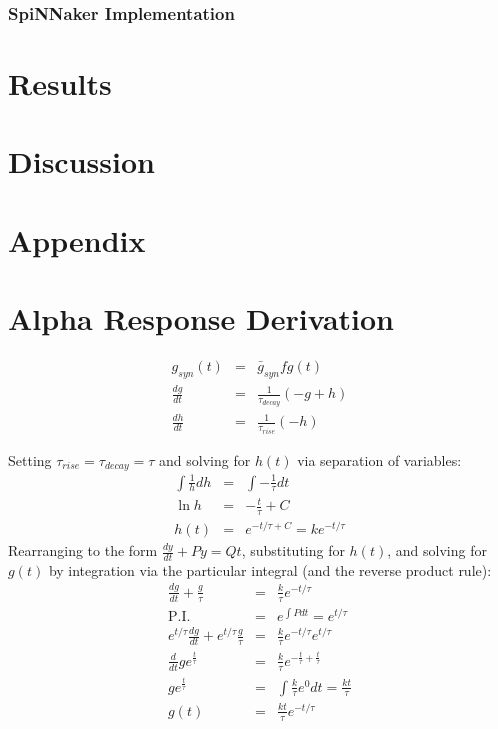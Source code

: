 \documentclass[12pt]{article}
\begin{document}
 \subsubsection*{SpiNNaker Implementation}

\section{Results}

\section{Discussion}
\section{Appendix}
\appendix
\section{Alpha Response Derivation}
\begin{eqnarray}
g_{syn}(t) & = & \bar{g}_{syn}fg(t) \nonumber \\
\frac{dg}{dt} & = & \frac{1}{\tau_{decay}} (-g + h) \nonumber \\
\frac{dh}{dt} & = & \frac{1}{\tau_{rise}}(-h) \nonumber
\end{eqnarray}

Setting $\tau_{rise}=\tau_{decay} = \tau$ and solving for $h(t)$ via separation
of variables:
\begin{eqnarray}
\int \frac{1}{h} dh & = & \int -\frac{1}{\tau}dt \nonumber \\
\ln{h}&=&-\frac{t}{\tau} + C \nonumber \\
h(t) & = & e^{-{t/\tau}+C} = ke^{-t / \tau} \nonumber
\end{eqnarray}
Rearranging to the form $\frac{dy}{dt} +Py = Qt$, substituting  for $h(t)$, and
solving for $g(t)$ by integration via the particular integral (and the reverse
product rule):
\begin{eqnarray}
\frac{dg}{dt} + \frac{g}{\tau}&=&\frac{k}{\tau}e^{-t/\tau} \nonumber\\
\mathrm{P.I.}&=& e^{\int P dt} = e^{t/ \tau} \nonumber \\
e^{t/\tau}\frac{dg}{dt} + e^{t/\tau}\frac{g}{\tau}
&=& \frac{k}{\tau}e^{-t/\tau}e^{t/\tau} \nonumber \\
\frac{d}{dt} g e^{\frac{t}{\tau}}&=&\frac{k}{\tau}e^{-\frac{t}{\tau}
+\frac{t}{\tau}} \nonumber \\
g e^{\frac{t}{\tau}} &=& \int \frac{k}{\tau}e^0 dt = \frac{kt}{\tau} \nonumber \\
g(t)&=&\frac{kt}{\tau}e^{-t/\tau}
\end{eqnarray}




\end{document}
